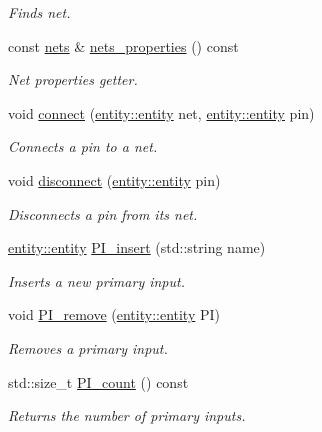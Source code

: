 \begin{DoxyCompactItemize}
\begin{DoxyCompactList}\small\item\em Finds net. \end{DoxyCompactList}\item 
const \hyperlink{classophidian_1_1netlist_1_1nets}{nets} \& \hyperlink{classophidian_1_1netlist_1_1netlist_ae643902ea56d79268ae044a5f732c7fb}{nets\-\_\-properties} () const 
\begin{DoxyCompactList}\small\item\em Net properties getter. \end{DoxyCompactList}\item 
void \hyperlink{classophidian_1_1netlist_1_1netlist_a733426ecede07f3d7b6d64b63c151a6e}{connect} (\hyperlink{classophidian_1_1entity_1_1entity}{entity\-::entity} net, \hyperlink{classophidian_1_1entity_1_1entity}{entity\-::entity} pin)
\begin{DoxyCompactList}\small\item\em Connects a pin to a net. \end{DoxyCompactList}\item 
void \hyperlink{classophidian_1_1netlist_1_1netlist_aa9e942e86e09f158dd3aa59dfc5e72ec}{disconnect} (\hyperlink{classophidian_1_1entity_1_1entity}{entity\-::entity} pin)
\begin{DoxyCompactList}\small\item\em Disconnects a pin from its net. \end{DoxyCompactList}\item 
\hyperlink{classophidian_1_1entity_1_1entity}{entity\-::entity} \hyperlink{classophidian_1_1netlist_1_1netlist_a2e6159790e5a61545e3a99083d715b0b}{P\-I\-\_\-insert} (std\-::string name)
\begin{DoxyCompactList}\small\item\em Inserts a new primary input. \end{DoxyCompactList}\item 
void \hyperlink{classophidian_1_1netlist_1_1netlist_a0357ec14b61d4a28bc76a637d12a26c1}{P\-I\-\_\-remove} (\hyperlink{classophidian_1_1entity_1_1entity}{entity\-::entity} P\-I)
\begin{DoxyCompactList}\small\item\em Removes a primary input. \end{DoxyCompactList}\item 
std\-::size\-\_\-t \hyperlink{classophidian_1_1netlist_1_1netlist_a4b3b3780c9aa759e4838faa0465e12dc}{P\-I\-\_\-count} () const 
\begin{DoxyCompactList}\small\item\em Returns the number of primary inputs. \end{DoxyCompactList}\item 

\end{DoxyCompactItemize}
